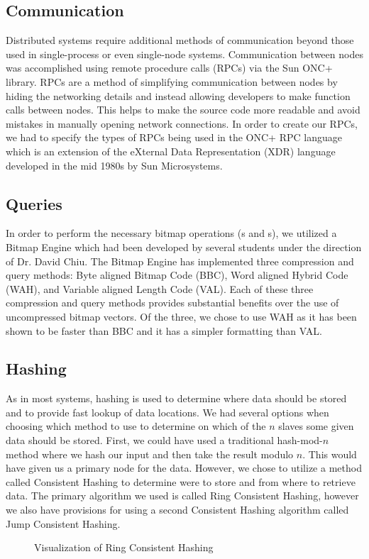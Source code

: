 \subsection{Communication}
Distributed systems require additional methods of communication beyond those used in single-process or even single-node systems.
Communication between nodes was accomplished using remote procedure calls (RPCs) via the Sun ONC+ library.
RPCs are a method of simplifying communication between nodes by hiding the networking details and instead allowing developers to make function calls between nodes.
This helps to make the source code more readable and avoid mistakes in manually opening network connections.
In order to create our RPCs, we had to specify the types of RPCs being used in the ONC+ RPC language which is an extension of the eXternal Data Representation (XDR) language developed in the mid 1980s by Sun Microsystems.
%
\subsection{Queries}
In order to perform the necessary bitmap operations (s and s), we utilized a Bitmap Engine which had been developed by several students under the direction of Dr. David Chiu.
The Bitmap Engine has implemented three compression and query methods: Byte aligned Bitmap Code (BBC), Word aligned Hybrid Code (WAH), and Variable aligned Length Code (VAL).
Each of these three compression and query methods provides substantial benefits over the use of uncompressed bitmap vectors.
Of the three, we chose to use WAH as it has been shown to be faster than BBC and it has a simpler formatting than VAL.
%
\subsection{Hashing}
As in most systems, hashing is used to determine where data should be stored and to provide fast lookup of data locations.
We had several options when choosing which method to use to determine on which of the \(n\) slaves some given data should be stored.
First, we could have used a traditional hash-mod-\(n\) method where we hash our input and then take the result modulo \(n\).
This would have given us a primary node for the data.
However, we chose to utilize a method called Consistent Hashing to determine were to store and from where to retrieve data.
The primary algorithm we used is called Ring Consistent Hashing, however we also have provisions for using a second Consistent Hashing algorithm called Jump Consistent Hashing.
\begin{figure}
    \centering
    
    \caption{Visualization of Ring Consistent Hashing}
\end{figure}
%
